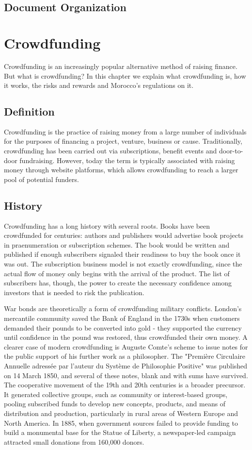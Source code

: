 \subsection*{Document Organization}



\section*{Crowdfunding}
Crowdfunding is an increasingly popular alternative method of raising finance.
But what is crowdfunding? In this chapter we explain what crowdfunding is, how it works, the risks and rewards and Morocco's regulations on it.
\subsection*{Definition}
Crowdfunding is the practice of raising money from a large number of individuals for the purposes of financing a project, venture, business or cause. Traditionally, crowdfunding has been carried out via subscriptions, benefit events and door-to-door fundraising. However, today the term is typically associated with raising money through website platforms, which allows crowdfunding to reach a larger pool of potential funders.
\subsection*{History}


Crowdfunding has a long history with several roots. Books have been crowdfunded for centuries: authors and publishers would advertise book projects in praenumeration or subscription schemes. The book would be written and published if enough subscribers signaled their readiness to buy the book once it was out. The subscription business model is not exactly crowdfunding, since the actual flow of money only begins with the arrival of the product. The list of subscribers has, though, the power to create the necessary confidence among investors that is needed to risk the publication.

War bonds are theoretically a form of crowdfunding military conflicts. London's mercantile community saved the Bank of England in the 1730s when customers demanded their pounds to be converted into gold - they supported the currency until confidence in the pound was restored, thus crowdfunded their own money. A clearer case of modern crowdfunding is Auguste Comte's scheme to issue notes for the public support of his further work as a philosopher. The "Première Circulaire Annuelle adressée par l'auteur du Système de Philosophie Positive" was published on 14 March 1850, and several of these notes, blank and with sums have survived.
The cooperative movement of the 19th and 20th centuries is a broader precursor. It generated collective groups, such as community or interest-based groups, pooling subscribed funds to develop new concepts, products, and means of distribution and production, particularly in rural areas of Western Europe and North America. In 1885, when government sources failed to provide funding to build a monumental base for the Statue of Liberty, a newspaper-led campaign attracted small donations from 160,000 donors.

